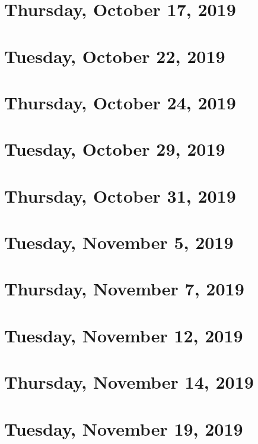 \documentclass{../mynotes}
\begin{document}
\section{Thursday, October 17, 2019}
    

\section{Tuesday, October 22, 2019}
    

\section{Thursday, October 24, 2019}
    

\section{Tuesday, October 29, 2019}
    
\section{Thursday, October 31, 2019}
    
    
\section{Tuesday, November 5, 2019}
    
\section{Thursday, November 7, 2019}
    

\section{Tuesday, November 12, 2019}
    
\section{Thursday, November 14, 2019}
    
    
\section{Tuesday, November 19, 2019}
    
\end{document}
